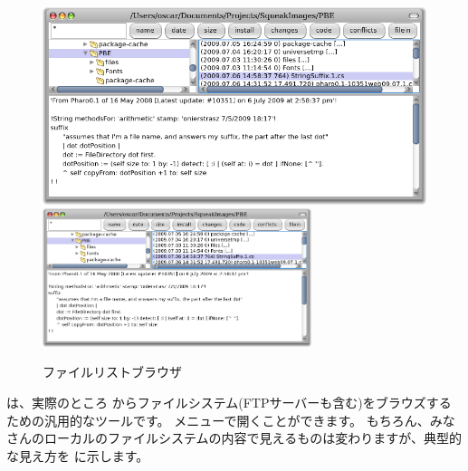 \documentclass[a4paper,10pt,twoside]{book}
\begin{document}
\begin{figure}[btp]
\begin{center}
\ifluluelse
{\includegraphics[width=\textwidth]{fileList}}
{\includegraphics[width=0.7\textwidth]{fileList}}
\end{center}
\caption{ファイルリストブラウザ}
\end{figure}

 は、実際のところ \pharo からファイルシステム(FTPサーバーも含む)をブラウズするための汎用的なツールです。
 メニューで開くことができます。
もちろん、みなさんのローカルのファイルシステムの内容で見えるものは変わりますが、典型的な見え方を  に示します。
\end{document}
